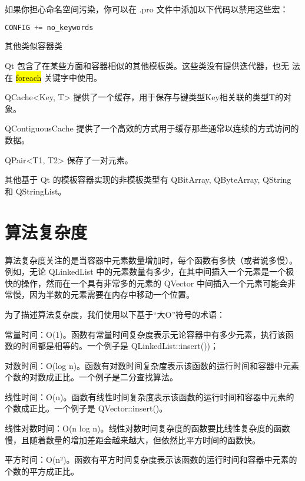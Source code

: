 如果你担心命名空间污染，你可以在 .pro 文件中添加以下代码以禁用这些宏：

\begin{lstlisting}[language=C++]
CONFIG += no_keywords
\end{lstlisting}

\splitLine

其他类似容器类

Qt 包含了在某些方面和容器相似的其他模板类。这些类没有提供迭代器，也无
法在 \hl{foreach} 关键字中使用。

\begin{compactitem}[\arr]
\item QCache<Key, T> 提供了一个缓存，用于保存与键类型Key相关联的类型T的对象。
\item QContiguousCache 提供了一个高效的方式用于缓存那些通常以连续的方式访问的数据。
\item QPair<T1, T2> 保存了一对元素。
\end{compactitem}

其他基于 Qt 的模板容器实现的非模板类型有 QBitArray, QByteArray, QString 和 QStringList。

\splitLine

\section{算法复杂度}

算法复杂度关注的是当容器中元素数量增加时，每个函数有多快（或者说多慢）。例如，无论 QLinkedList 中的元素数量有多少，在其中间插入一个元素是一个极快的操作，然而在一个具有非常多的元素的 QVector 中间插入一个元素可能会非常慢，因为半数的元素需要在内存中移动一个位置。

为了描述算法复杂度，我们使用以下基于“大O”符号的术语：

\begin{compactitem}[\arr]
\item 常量时间：O(1)。函数有常量时间复杂度表示无论容器中有多少元素，执行该函数的时间都是相等的。一个例子是 QLinkedList::insert())；
\item 对数时间：O(log n)。函数有对数时间复杂度表示该函数的运行时间和容器中元素个数的对数成正比。一个例子是二分查找算法。
\item 线性时间：O(n)。函数有线性时间复杂度表示该函数的运行时间和容器中元素的个数成正比。一个例子是 QVector::insert()。
\item 线性对数时间：O(n log n)。线性对数时间复杂度的函数要比线性复杂度的函数慢，且随着数量的增加差距会越来越大，但依然比平方时间的函数快。
\item 平方时间：O(n²)。函数有平方时间复杂度表示该函数的运行时间和容器中元素的个数的平方成正比。
\end{compactitem}

